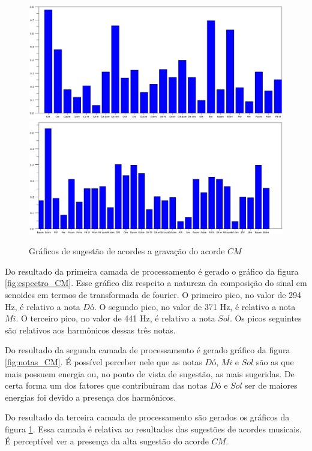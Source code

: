 \begin{figure}[h]
	\centering
		\includegraphics[keepaspectratio=true,scale=0.45]{figuras/CM/acordes_1_cm.eps}
		\includegraphics[keepaspectratio=true,scale=0.45]{figuras/CM/acordes_2_cm.eps}
	\caption{Gráficos de sugestão de acordes a gravação do acorde $CM$}
  \label{fig:acordes_CM}
\end{figure}
\newpage
Do resultado da primeira camada de processamento é gerado o gráfico da figura \ref{fig:espectro_CM}. Esse gráfico diz respeito a natureza da composição do sinal em senoides em termos de transformada de fourier. O primeiro pico, no valor de 294 Hz, é relativo a nota $Dó$. O segundo pico, no valor de 371 Hz, é relativo a nota $Mi$. O terceiro pico, no valor de 441 Hz, é relativo a nota $Sol$. Os picos seguintes são relativos aos harmônicos dessas três notas.

Do resultado da segunda camada de processamento é gerado gráfico da figura \ref{fig:notas_CM}. É possível perceber nele que as notas $Dó$, $Mi$ e $Sol$ são as que mais possuem energia ou, no ponto de vista de sugestão, as mais sugeridas. De certa forma um dos fatores que contribuiram das notas $Dó$ e $Sol$ ser de maiores energias foi devido a presença dos harmônicos.

Do resultado da terceira camada de processamento são gerados os gráficos da figura \ref{fig:acordes_CM}. Essa camada é relativa ao resultados das sugestões de acordes musicais. É perceptível ver a presença da alta sugestão do acorde $CM$.

